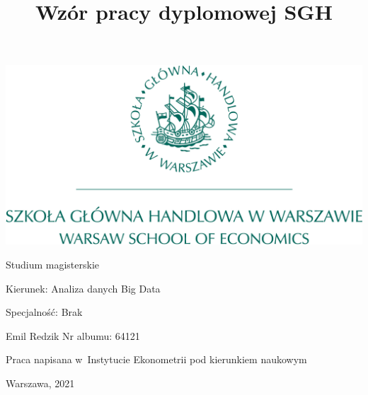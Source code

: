 \documentclass[12pt,a4paper,twoside,openany]{book}
\begin{document}
\begin{center}
\includegraphics[scale=0.3]{sgh_full.png}

\vspace{1cm}

Studium magisterskie
\end{center}

\vspace{1cm}

\noindent Kierunek: Analiza danych Big Data

\noindent Specjalność: Brak

\vspace{1cm}

{
\leftskip=10cm\noindent
Emil Redzik\newline
Nr albumu: 64121

}

\vspace{2cm}

\title{Wzór pracy dyplomowej SGH}
\makeatletter

\begin{center}
\LARGE\bf
\fbox{\@title}
\end{center}

\vspace{2cm}

{
\leftskip=10cm\noindent
Praca \newline 
napisana w~Instytucie Ekonometrii\newline
pod kierunkiem naukowym\newline
{}

}

\vfill

\begin{center}
Warszawa, 2021
\end{center}
\thispagestyle{empty}
\end{document}
